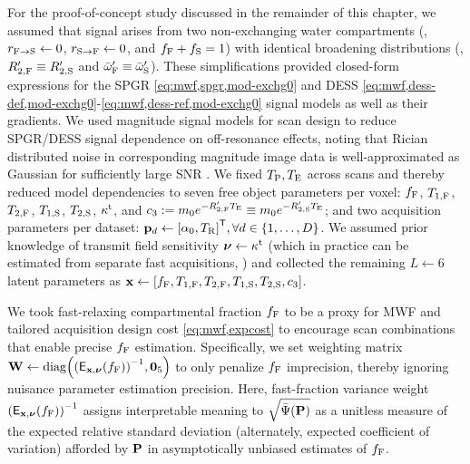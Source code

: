 For the proof-of-concept study
discussed in the remainder of this chapter,
we assumed that signal arises
from two non-exchanging water compartments
(\ie, $r_{\mathrm{F}\to\mathrm{S}} \gets 0$, $r_{\mathrm{S}\to\mathrm{F}} \gets 0$, and $f_{\mathrm{F}} + f_{\mathrm{S}} = 1$)
with identical broadening distributions
(\ie, $R_{2,\mathrm{F}}' \equiv R_{2,\mathrm{S}}'$ and $\bar{\omega}_{\mathrm{F}}' \equiv \bar{\omega}_{\mathrm{S}}'$).
These simplifications provided closed-form expressions
for the SPGR 
\eqref{eq:mwf,spgr,mod-exchg0}
and DESS 
\eqref{eq:mwf,dess-def,mod-exchg0}-\eqref{eq:mwf,dess-ref,mod-exchg0}
signal models 
as well as their gradients.
We used magnitude signal models
for scan design
to reduce SPGR/DESS signal dependence
on off-resonance effects,
noting that Rician distributed noise 
in corresponding magnitude image data
is well-approximated as Gaussian
for sufficiently large SNR \cite{gudbjartsson:95:trd}. 
We fixed $T_\mathrm{P},T_\mathrm{E}$ across scans
and thereby reduced model dependencies 
to seven free object parameters per voxel:
$f_{\mathrm{F}}$, $T_{1,\mathrm{F}}$, $T_{2,\mathrm{F}}$, $T_{1,\mathrm{S}}$, $T_{2,\mathrm{S}}$, $\kappa^{\mathrm{t}}$, and
$c_{3} := m_0 e^{-R_{2,\mathrm{F}}' T_\mathrm{E}} \equiv m_0 e^{-R_{2,\mathrm{S}}' T_\mathrm{E}}$;
and two acquisition parameters per dataset:
$\bmp_d \gets \brac{\flipnom, \TR}\tpose, \forall d \in \set{1,\dots,D}$.
We assumed prior knowledge 
of transmit field sensitivity $\boldsymbol{\nu} \gets \kappa^{\mathrm{t}}$ 
(which in practice can be estimated
from separate fast acquisitions, \eg \cite{sacolick:10:bmb})
and collected the remaining $L \gets 6$ latent parameters
as $\bmx \gets \brac{\ff, \tf{1}, \tf{2}, \ts{1}, \ts{2}, \const{3}}$.

We took fast-relaxing compartmental fraction $f_{\mathrm{F}}$ 
to be a proxy for MWF
and tailored acquisition design cost \eqref{eq:mwf,expcost}
to encourage scan combinations
that enable precise $f_{\mathrm{F}}$ estimation.
Specifically,
we set weighting matrix 
$\bmW \gets \diag{\inv{\expect{\bmx,\bmnu}{\ff}}, \zeros{5}}$
to only penalize $f_{\mathrm{F}}$ imprecision,
thereby ignoring nuisance parameter estimation precision.
Here, 
fast-fraction variance weight 
$\inv{\expect{\bmx,\bmnu}{\ff}}$ assigns interpretable meaning
to $\sqrt{\expcost\paren{\bmP}}$ 
as a unitless measure
of the expected relative standard deviation
(alternately, expected coefficient of variation)
afforded by $\mathbf{P}$ 
in asymptotically unbiased estimates of $f_{\mathrm{F}}$. 

